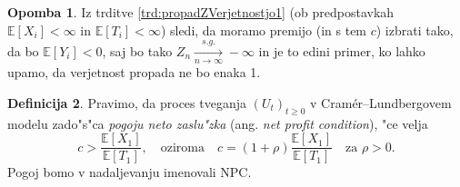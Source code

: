 \documentclass[12pt, a4paper, reqno]{amsart}
\theoremstyle{definition}
\newtheorem{definicija}{Definicija}[section]
\newtheorem{opomba}[definicija]{Opomba}
\theoremstyle{plain}
\newcommand{\N}{\mathbb{N}}
\newcommand{\E}{\mathbb{E}}
\newcommand{\Prob}{\mathbb{P}}
\newcommand{\1}{\mathds{1}}
\begin{document}
        \begin{opomba}
            Iz trditve \ref{trd:propadZVerjetnostjo1} (ob predpostavkah $\E\left[X_i\right] < \infty$
            in $\E\left[T_i\right] < \infty$) sledi, da moramo premijo (in s tem $c$) izbrati tako, da bo 
            $\E\left[Y_i\right] < 0$, saj bo tako $Z_{n} \xrightarrow[n\to\infty]{s.g.}-\infty$
            in je to edini primer, ko lahko upamo, da verjetnost propada ne bo
            enaka 1.
            \label{op:izbiraPremije}
        \end{opomba}
    
%
%
%

        \begin{definicija}
            Pravimo, da proces tveganja $(U_t)_{t\geq0}$ v Cramér--Lundbergovem modelu
             zado"s"ca \textit{pogoju neto zaslu"zka} (ang. \textit{net profit condition}), "ce velja 
            \begin{equation*}
                c > \frac{\E\left[X_1\right]}{\E\left[T_1\right]}, \quad \text{oziroma} \quad 
                c = (1 + \rho)\frac{\E\left[X_1\right]}{\E\left[T_1\right]} \quad \text{za $\rho > 0$}.
            \end{equation*}
            Pogoj bomo v nadaljevanju imenovali NPC.
            \label{def:NPC}
        \end{definicija}
\end{document}
